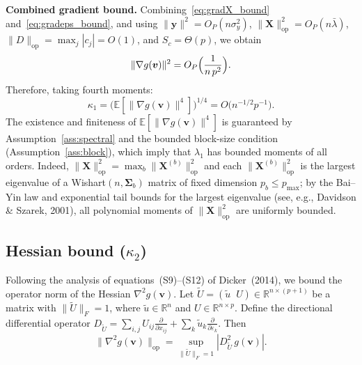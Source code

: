 \documentclass[11pt]{article}
\newcommand{\R}{\mathbb{R}}
\newcommand{\E}{\mathbb{E}}
\newcommand{\op}{\mathrm{op}}
\newcommand{\X}{\bm{X}}
\newcommand{\y}{\bm{y}}
\newcommand{\bSig}{\bm{\Sigma}}
\newcommand{\bv}{\bm{v}}
\begin{document}
\medskip
\noindent\textbf{Combined gradient bound.}\;
Combining~\eqref{eq:gradX_bound} and~\eqref{eq:gradeps_bound}, and using
$\|\y\|^{2}=O_P(n\sigma_y^{2})$,
$\|\X\|_{\op}^{2}=O_P(n\bar\lambda)$, $\|D\|_{\op}=\max_j|c_j|=O(1)$,
and $S_c=\Theta(p)$, we obtain
\begin{equation}\label{eq:grad_norm_bound}
  \|\nabla g(\bv)\|^{2}
  = O_P\Bigl(\frac{1}{n\,p^{2}}\Bigr).
\end{equation}
Therefore, taking fourth moments:
\begin{equation}\label{eq:kappa1_bound}
  \boxed{\;\kappa_1
  = \bigl(\E[\|\nabla g(\bv)\|^{4}]\bigr)^{1/4}
  = O\bigl(n^{-1/2}p^{-1}\bigr).\;}
\end{equation}
The existence and finiteness of $\E[\|\nabla g(\bv)\|^{4}]$ is guaranteed by
Assumption~\ref{ass:spectral} and the bounded block-size condition
(Assumption~\ref{ass:block}), which imply that $\lambda_1$ has bounded moments
of all orders.  Indeed, $\|\X\|_{\op}^{2}=\max_b\|\X^{(b)}\|_{\op}^{2}$ and
each $\|\X^{(b)}\|_{\op}^{2}$ is the largest eigenvalue of a
Wishart$(n,\bSig_b)$ matrix of fixed dimension $p_b\le p_{\max}$; by the
Bai--Yin law and exponential tail bounds for the largest eigenvalue
(see, e.g., Davidson \& Szarek, 2001), all polynomial moments of
$\|\X\|_{\op}^{2}$ are uniformly bounded.

\subsection{Hessian bound ($\kappa_2$)}\label{ssec:kappa2}

Following the analysis of equations~(S9)--(S12) of Dicker~(2014), we bound
the operator norm of the Hessian $\nabla^{2}g(\bv)$.  Let
$\tilde U=(\tilde u\;\;U)\in\R^{n\times(p+1)}$ be a matrix with
$\|\tilde U\|_F=1$, where $\tilde u\in\R^{n}$ and $U\in\R^{n\times p}$.
Define the directional differential operator
$D_{\tilde U}=\sum_{i,j}U_{ij}\frac{\partial}{\partial x_{ij}}
+\sum_k\tilde u_k\frac{\partial}{\partial\varepsilon_k}$.
Then
\begin{equation}\label{eq:Hessian_op}
  \|\nabla^{2}g(\bv)\|_{\op}
  = \sup_{\|\tilde U\|_F=1}|D_{\tilde U}^{2}\,g(\bv)|.
\end{equation}
\end{document}
